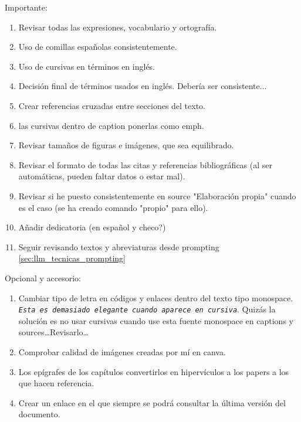 
\newpage
\pagecolor{yellow!30}
Importante:
  \begin{enumerate}
    \item Revisar todas las expresiones, vocabulario y ortografía.
    \item Uso de comillas españolas consistentemente.
    \item Uso de cursivas en términos en inglés.
    \item Decisión final de términos usados en inglés. Debería ser consistente...
    \item Crear referencias cruzadas entre secciones del texto.
    \item las cursivas dentro de caption ponerlas como emph.
    \item Revisar tamaños de figuras e imágenes, que sea equilibrado.
    \item Revisar el formato de todas las citas y referencias bibliográficas (al ser automáticas, pueden faltar datos o estar mal).
    \item Revisar si he puesto consistentemente en source "Elaboración propia" cuando es el caso (se ha creado comando "propio" para ello).
    \item Añadir dedicatoria (en español y checo?) %
    \item Seguir revisando textos y abreviaturas desde prompting \ref{sec:llm_tecnicas_prompting}
  \end{enumerate}

  
  Opcional y accesorio:
  \begin{enumerate}
    \item Cambiar tipo de letra en códigos y enlaces dentro del texto tipo monospace. \texttt{\textit{Esta es demasiado elegante cuando aparece en cursiva}}. Quizás la solución es no usar cursivas cuando use esta fuente monospace en captions y sources\dots Revisarlo\dots
    \item Comprobar calidad de imágenes creadas por mí en canva.
    \item Los epígrafes de los capítulos convertirlos en hipervículos a los papers a los que hacen referencia.
    \item Crear un enlace en el que siempre se podrá consultar la última versión del documento.
  \end{enumerate}




